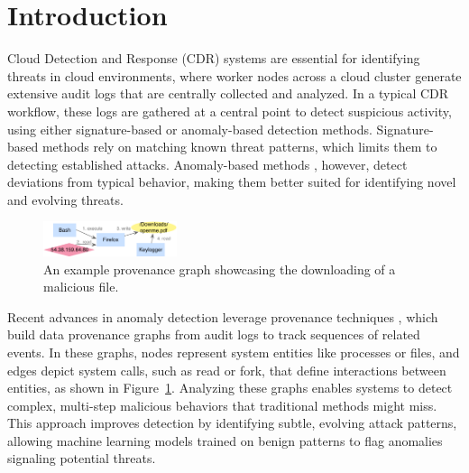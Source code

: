 \section*{Introduction}


Cloud Detection and Response (CDR) systems are essential for identifying threats in cloud environments, where worker nodes across a cloud cluster generate extensive audit logs that are centrally collected and analyzed. In a typical CDR workflow, these logs are gathered at a central point to detect suspicious activity, using either signature-based or anomaly-based detection methods. Signature-based methods \cite{elasticdetectionrules,chronicledetectionrules} rely on matching known threat patterns, which limits them to detecting established attacks. Anomaly-based methods \cite{aljawarneh2018anomaly,cai2021structural}, however, detect deviations from typical behavior, making them better suited for identifying novel and evolving threats.

\begin{figure}
    \centering \includegraphics[width=0.35\textwidth]{fig/example.pdf}
    \caption{An example provenance graph showcasing the downloading of a malicious file. }
    \label{fig:example:provenance}
    \vspace{-2ex}
\end{figure}

Recent advances in anomaly detection leverage provenance techniques \cite{yangprographer,flash2024,cheng2023kairos}, which build data provenance graphs from audit logs to track sequences of related events. In these graphs, nodes represent system entities like processes or files, and edges depict system calls, such as read or fork, that define interactions between entities, as shown in Figure~\ref{fig:example:provenance}. Analyzing these graphs enables systems to detect complex, multi-step malicious behaviors that traditional methods might miss. This approach improves detection by identifying subtle, evolving attack patterns, allowing machine learning models trained on benign patterns to flag anomalies signaling potential threats.



